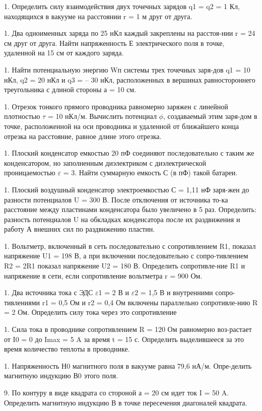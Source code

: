 1. Определить силу взаимодействия двух точечных зарядов q1 = q2 = 1 Кл, находящихся в вакууме на расстоянии r = 1 м друг от друга.

1. Два одноименных заряда по 25 нКл каждый закреплены на расстоя-нии r = 24 см друг от друга. Найти напряженность Е электрического поля в точке, удаленной на 15 см от каждого заряда.

1. Найти потенциальную энергию Wп системы трех точечных заря-дов q1 = 10 нКл, q2 = 20 нКл и q3 = – 30 нКл, расположенных в вершинах равностороннего треугольника с длиной стороны а = 10 см.

1. Отрезок тонкого прямого проводника равномерно заряжен с линейной плотностью $ \tau $ = 10 нКл/м. Вычислить потенциал $ \phi $, создаваемый этим заря-дом в точке, расположенной на оси проводника и удаленной от ближайшего конца отрезка на расстояние, равное длине этого отрезка.

1. Плоский конденсатор емкостью 20 пФ соединяют последовательно с таким же конденсатором, но заполненным диэлектриком с диэлектрической проницаемостью $ \varepsilon $ = 3. Найти суммарную емкость С (в пФ) такой батареи.

1. Плоский воздушный конденсатор электроемкостью С = 1,11 нФ заря-жен до разности потенциалов U = 300 В. После отключения от источника то-ка расстояние между пластинами конденсатора было увеличено в 5 раз. Определить: разность потенциалов U на обкладках конденсатора после их раздвижения и работу А внешних сил по раздвижению пластин.

1. Вольтметр, включенный в сеть последовательно с сопротивлением R1, показал напряжение U1 = 198 В, а при включении последовательно с сопро-тивлением R2 = 2R1 показал напряжение U2 = 180 В. Определить сопротивле-ние R1 и напряжение в сети, если сопротивление вольтметра r = 900 Ом.

1. Два источника тока с ЭДС $ \varepsilon $1 = 2 В и $ \varepsilon $2 = 1,5 В и внутренними сопро-тивлениями r1 = 0,5 Ом и r2 = 0,4 Ом включены параллельно сопротивле-нию R = 2 Ом. Определить силу тока через это сопротивление

1. Сила тока в проводнике сопротивлением R = 120 Ом равномерно воз-растает от I0 = 0 до Imax = 5 A за время t = 15 с. Определить выделившееся за это время количество теплоты в проводнике.

1. Напряженность Н0 магнитного поля в вакууме равна 79,6 нА/м. Опре-делить магнитную индукцию В0 этого поля.

9. По контуру в виде квадрата со стороной а = 20 см идет ток I = 50 A. Определить магнитную индукцию В в точке пересечения диагоналей квадрата.

